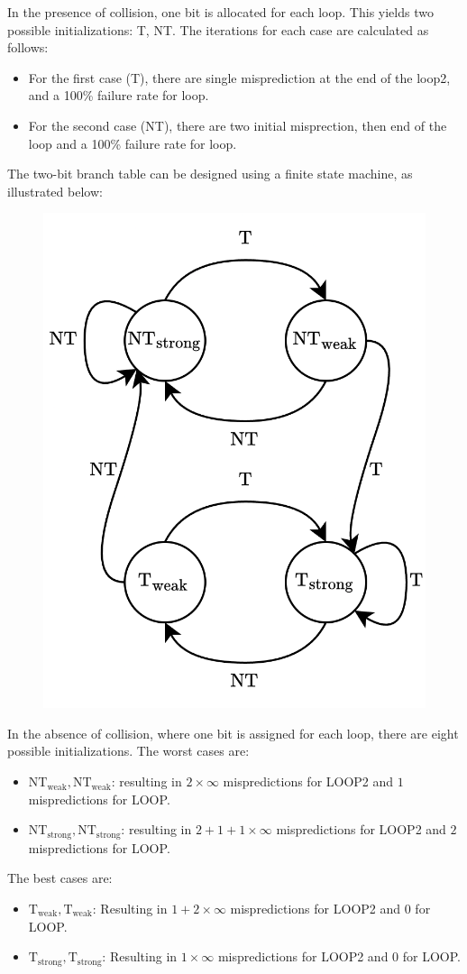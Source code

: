 In the presence of collision, one bit is allocated for each loop. 
This yields two possible initializations: T, NT.\@
The iterations for each case are calculated as follows:
\begin{itemize}
    \item For the first case (T), there are  single misprediction at the end of the loop2, and a 100\% failure rate for loop. 
    \item For the second case (NT), there are two initial misprection, then end of the loop and a 100\% failure rate for loop. 
\end{itemize}

The two-bit branch table can be designed using a finite state machine, as illustrated below:
\begin{figure}[H]
    \centering
    \includegraphics[width=0.4\linewidth]{images/2bht.png}
\end{figure}
In the absence of collision, where one bit is assigned for each loop, there are eight possible initializations.
The worst cases are:
\begin{itemize}
    \item $\text{NT}_{\text{weak}},\text{NT}_{\text{weak}}$: resulting in $2\times\infty$ mispredictions for LOOP2 and $1$ mispredictions for LOOP.\@
    \item $\text{NT}_{\text{strong}},\text{NT}_{\text{strong}}$: resulting in $2+1+1\times\infty$ mispredictions for LOOP2 and $2$ mispredictions for LOOP.\@
\end{itemize}
The best cases are: 
\begin{itemize}
    \item $\text{T}_{\text{weak}},\text{T}_{\text{weak}}$: Resulting in $1 + 2\times\infty$ mispredictions for LOOP2 and $0$ for LOOP.\@
    \item $\text{T}_{\text{strong}},\text{T}_{\text{strong}}$: Resulting in $1 \times\infty$ mispredictions for LOOP2 and $0$ for LOOP.\@
\end{itemize}